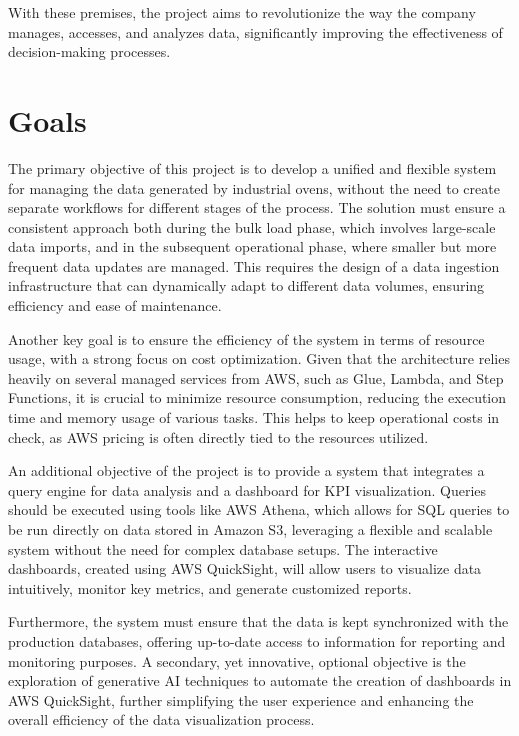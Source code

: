 With these premises, the project aims to revolutionize the way the company manages, accesses, and analyzes data, significantly improving the effectiveness of decision-making processes.


\section{Goals}
The primary objective of this project is to develop a unified and flexible system for managing the data generated by industrial ovens, without the need to create separate workflows for different stages of the process. The solution must ensure a consistent approach both during the bulk load phase, which involves large-scale data imports, and in the subsequent operational phase, where smaller but more frequent data updates are managed. This requires the design of a data ingestion infrastructure that can dynamically adapt to different data volumes, ensuring efficiency and ease of maintenance.

Another key goal is to ensure the efficiency of the system in terms of resource usage, with a strong focus on cost optimization. Given that the architecture relies heavily on several managed services from \ac{AWS}, such as Glue, Lambda, and Step Functions, it is crucial to minimize resource consumption, reducing the execution time and memory usage of various tasks. This helps to keep operational costs in check, as \ac{AWS} pricing is often directly tied to the resources utilized.

An additional objective of the project is to provide a system that integrates a query engine for data analysis and a dashboard for \ac{KPI} visualization. Queries should be executed using tools like \ac{AWS} Athena, which allows for \ac{SQL} queries to be run directly on data stored in Amazon S3, leveraging a flexible and scalable system without the need for complex database setups. The interactive dashboards, created using \ac{AWS} QuickSight, will allow users to visualize data intuitively, monitor key metrics, and generate customized reports.

Furthermore, the system must ensure that the data is kept synchronized with the production databases, offering up-to-date access to information for reporting and monitoring purposes. A secondary, yet innovative, optional objective is the exploration of generative AI techniques to automate the creation of dashboards in \ac{AWS} QuickSight, further simplifying the user experience and enhancing the overall efficiency of the data visualization process.

